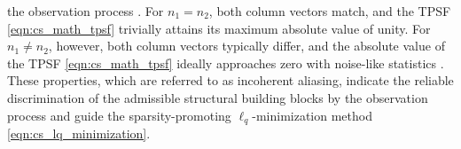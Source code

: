 the observation process
\cite{article:LustigMRM2007}.
For
$n_{1} = n_{2}$,
both column vectors match, and
the \ac{TPSF}
\eqref{eqn:cs_math_tpsf} trivially attains
its maximum absolute value of
unity.
For
$n_{1} \neq n_{2}$, however,
both column vectors typically differ, and
the absolute value of
the \ac{TPSF}
\eqref{eqn:cs_math_tpsf} ideally approaches
zero with
noise-like statistics
\cite{article:ProvostITMI2009,article:LustigMRM2007}.
These properties, which are referred to as
incoherent aliasing, indicate
the reliable discrimination of
the admissible structural building blocks by
the observation process and guide
the sparsity-promoting $\ell_{q}$-minimization method
\eqref{eqn:cs_lq_minimization}.
